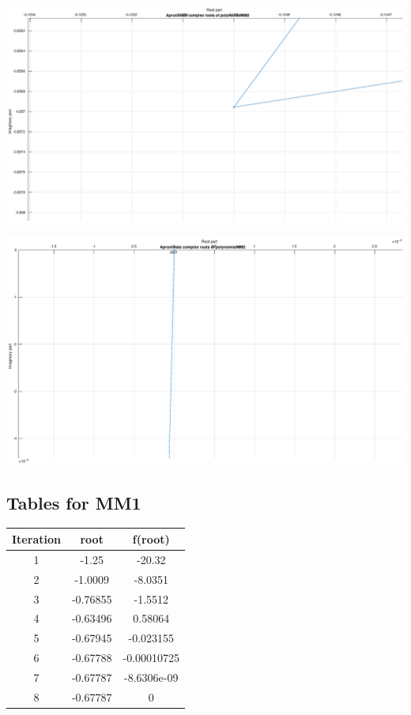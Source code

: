 \documentclass[12pt]{report}
\begin{document}
\begin{center}
   \includegraphics[scale=0.25]{task2mm2complexleft.eps}
\end{center}

\begin{center}
   \includegraphics[scale=0.25]{task2mm2complexup.eps}
\end{center}

\subsection{Tables for MM1}
\begin{center}
  \begin{tabular}{| c  c c |}
\hline
Iteration & root         & f(root) \\
\hline
1    &     -1.25  &        -20.32 \\
\hline
2    &   -1.0009  &       -8.0351 \\
\hline
3    &  -0.76855  &       -1.5512 \\
\hline
4    &  -0.63496  &       0.58064 \\
\hline
5    &  -0.67945  &     -0.023155 \\
\hline
6    & -0.67788   &  -0.00010725 \\
\hline
7    & -0.67787   &  -8.6306e-09 \\
\hline
8    &  -0.67787  &             0 \\
\hline
\hline

\end{tabular}
\end{center}
\end{document}
